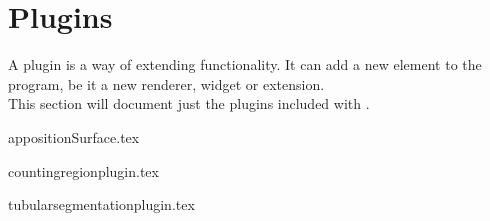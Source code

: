\section{Plugins}

A plugin is a way of extending \espina{} functionality. It can
add a new element to the program, be it a new renderer, widget or
extension. \\
This section will document just the plugins included with \espina.

 {appositionSurface.tex}

 {countingregionplugin.tex}

 {tubularsegmentationplugin.tex}

